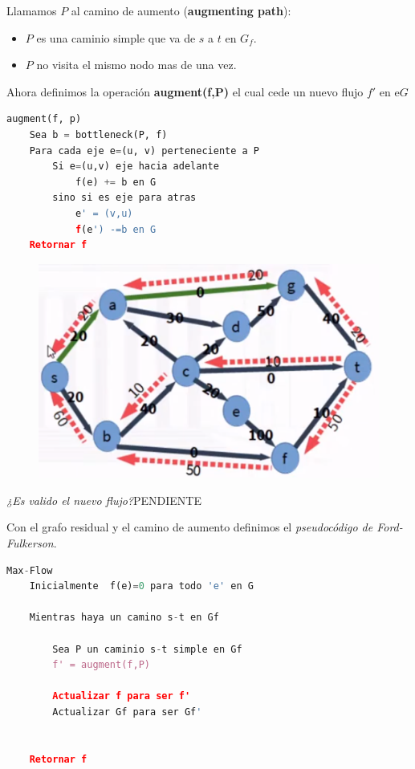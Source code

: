 \documentclass{article}
\begin{document}
Llamamos \(P\) al camino de aumento (\textbf{augmenting path}):

\begin{itemize}
    \item \(P\) es una caminio simple que va de \(s\) a \(t\) en \(G_f\).
    \item \(P\) no visita el mismo nodo mas de una vez.
\end{itemize}
 
Ahora definimos la operación \textbf{augment(f,P)} el cual cede un nuevo flujo \(f'\) en e\(G\)

\begin{lstlisting}[language=Python, caption=Operación de augment]
augment(f, p)
    Sea b = bottleneck(P, f)
    Para cada eje e=(u, v) perteneciente a P
        Si e=(u,v) eje hacia adelante
            f(e) += b en G
        sino si es eje para atras 
            e' = (v,u)
            f(e') -=b en G   
    Retornar f
\end{lstlisting}


\begin{figure}[h!]
    \includegraphics[width=\linewidth]{imagenes/camino-aumento.png}
\end{figure}

\textit{¿Es valido el nuevo flujo?}PENDIENTE

Con el grafo residual y el camino de aumento definimos el \textit{pseudocódigo de Ford-Fulkerson}.


\begin{lstlisting}[language=Python, caption=Operación de augment]
Max-Flow
    Inicialmente  f(e)=0 para todo 'e' en G

    Mientras haya un camino s-t en Gf

        Sea P un caminio s-t simple en Gf
        f' = augment(f,P)

        Actualizar f para ser f'
        Actualizar Gf para ser Gf'


    Retornar f
\end{lstlisting}
\end{document}
